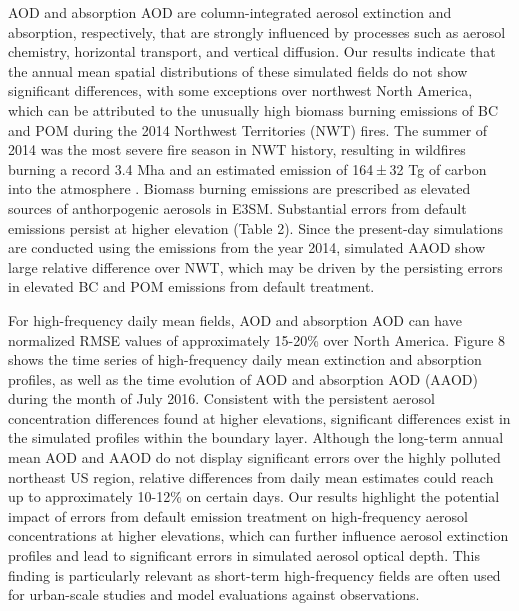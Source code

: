AOD and absorption AOD are column-integrated aerosol extinction and absorption, respectively, that are strongly influenced by processes such as aerosol chemistry, horizontal transport, and vertical diffusion. Our results indicate that the annual mean spatial distributions of these simulated fields do not show significant differences, with some exceptions over northwest North America, which can be attributed to the unusually high biomass burning emissions of BC and POM during the 2014 Northwest Territories (NWT) fires. The summer of 2014 was the most severe fire season in NWT history, resulting in wildfires burning a record 3.4 Mha and an estimated emission of 164 ± 32 Tg of carbon into the atmosphere \citep{veraverbeke2017lightning,kochtubajda2019assessment}. Biomass burning emissions are prescribed as elevated sources of anthorpogenic aerosols in E3SM. Substantial errors from default emissions persist at higher elevation (Table 2). Since the present-day simulations are conducted using the emissions from the year 2014, simulated AAOD show large relative difference over NWT, which may be driven by the persisting errors in elevated BC and POM emissions from default treatment. 

For high-frequency daily mean fields, AOD and absorption AOD can have normalized RMSE values of approximately 15-20\% over North America. Figure 8 shows the time series of high-frequency daily mean extinction and absorption profiles, as well as the time evolution of AOD and absorption AOD (AAOD) during the month of July 2016. Consistent with the persistent aerosol concentration differences found at higher elevations, significant differences exist in the simulated profiles within the boundary layer. Although the long-term annual mean AOD and AAOD do not display significant errors over the highly polluted northeast US region, relative differences from daily mean estimates could reach up to approximately 10-12\% on certain days. Our results highlight the potential impact of errors from default emission treatment on high-frequency aerosol concentrations at higher elevations, which can further influence aerosol extinction profiles and lead to significant errors in simulated aerosol optical depth. This finding is particularly relevant as short-term high-frequency fields are often used for urban-scale studies and model evaluations against observations.

